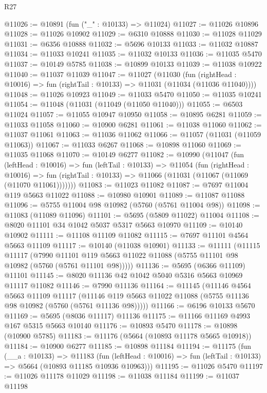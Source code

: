 \begin{lexlean}{R27}
\begin{coremodule}
@11026 := @10891 (fun ("_" : @10133) => @11024)
@11027 := @11026 @10896
@11028 := @11026 @10902
@11029 := @6310 @10888
@11030 := @11028 @11029
@11031 := @6356 @10888
@11032 := @5696 @10133
@11033 := @11032 @10887
@11034 := @11033 @10241
@11035 := @11032 @10133
@11036 := @11035 @5470
@11037 := @10149 @5785
@11038 := @10899 @10133
@11039 := @11038 @10922
@11040 := @11037 @11039
@11047 := @11027
    (@11030
      (fun (rightHead : @10016) => fun (rightTail : @10133) => @11031 (@11034 (@11036 @11040))))
@11048 := @11026 @10923
@11049 := @11033 @5470
@11050 := @11035 @10241
@11054 := @11048 (@11031 (@11049 (@11050 @11040)))
@11055 := @6503 @11024
@11057 := @11055 @10947 @10950
@11058 := @10895 @6281
@11059 := @11033 @11058
@11060 := @10900 @6281
@11061 := @11038 @11060
@11062 := @11037 @11061
@11063 := @11036 @11062
@11066 := @11057 (@11031 (@11059 @11063))
@11067 := @11033 @6267
@11068 := @10898 @11060
@11069 := @11035 @11068
@11070 := @10149 @6277
@11082 := @10990
    (@11047
      (fun (leftHead : @10016) =>
      fun (leftTail : @10133) =>
      @11054
        (fun (rightHead : @10016) =>
        fun (rightTail : @10133) => @11066 (@11031 (@11067 (@11069 (@11070 @11061)))))))
@11083 := @11023 @11082
@11087 := @7697 @11004 @119 @5663 @11022
@11088 := @10980 @10901
@11089 := @11087 @11088
@11096 := @5755 @11004 @98 @10982 (@5760 (@5761 @11004 @98))
@11098 := @11083 (@11089 @11096)
@11101 := @5695 (@5809 @11022) @11004
@11108 := @8020 @11101 @34 @1042 @5037 @5317 @5663 @10970
@11109 := @10140 @10902
@11111 := @11108 @11109 @11082
@11115 := @7697 @11101 @4564 @5663 @11109
@11117 := @10140 (@11038 @10901)
@11133 := @11111
    (@11115
      @11117
      (@7990 @11101 @119 @5663 @11022 @11088 (@5755 @11101 @98 @10982 (@5760 (@5761 @11101 @98)))))
@11136 := @5695 (@6366 @11109) @11101
@11145 := @8020 @11136 @42 @1042 @5040 @5316 @5663 @10969 @11117 @11082
@11146 := @7990 @11136
@11164 := @11145
    (@11146
      @4564
      @5663
      @11109
      @11117
      (@11146 @119 @5663 @11022 @11088 (@5755 @11136 @98 @10982 (@5760 (@5761 @11136 @98)))))
@11166 := @6196 @10133 @5670
@11169 := @5695 (@8036 @11117) @11136
@11175 := @11166 @11169 @4993 @167 @5315 @5663 @10140
@11176 := @10893 @5470
@11178 := @10898 (@10900 @5785)
@11183 := @11176 (@5664 (@10893 @11178 @5665 @10918))
@11184 := @10900 @6277
@11185 := @10898 @11184
@11194 := @11175
    (fun (__a : @10133) =>
    @11183
      (fun (leftHead : @10016) => fun (leftTail : @10133) => @5664 (@10893 @11185 @10936 @10963)))
@11195 := @11026 @5470
@11197 := @11026 @11178 @11029
@11198 := @11038 @11184
@11199 := @11037 @11198

\end{coremodule}
\end{lexlean}
